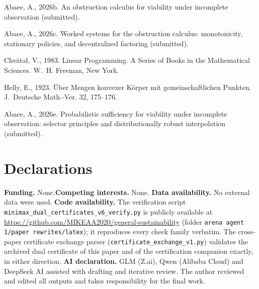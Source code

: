 \documentclass[10pt,twocolumn]{article}
\theoremstyle{definition}
\begin{document}
Abaee, A., 2026b. An obstruction calculus for viability under incomplete
observation (submitted).

Abaee, A., 2026c. Worked systems for the obstruction calculus:
monotonicity, stationary policies, and decentralized factoring
(submitted).

Chv\'{a}tal, V., 1983. Linear Programming. A Series of Books in the
Mathematical Sciences. W.~H. Freeman, New York.

Helly, E., 1923. \"Uber Mengen konvexer K\"orper mit gemeinschaftlichen
Punkten. J.~Deutsche Math.-Ver. 32, 175--176.

Abaee, A., 2026e. Probabilistic sufficiency for viability under incomplete
observation: selector principles and distributionally robust interpolation
(submitted).

\section*{Declarations}
\textbf{Funding.} None.\quad \textbf{Competing interests.} None.\quad
\textbf{Data availability.} No external data were used.\quad
\textbf{Code availability.} The verification script
\texttt{minimax\_dual\_certificates\_v6\_verify.py} is publicly available
at \url{https://github.com/MIKEAA2020/general-sustainability} (folder
\texttt{arena agent 1/paper rewrites/latex}); it reproduces every check family verbatim. The cross-paper certificate
exchange parser (\texttt{certificate\_exchange\_v1.py}) validates the
archived dual certificate of this paper and of the certification companion
exactly, in either direction.\quad
\textbf{AI declaration.} GLM (Z.ai), Qwen (Alibaba Cloud) and DeepSeek AI
assisted with drafting and iterative review. The author reviewed and
edited all outputs and takes responsibility for the final work.
\end{document}
